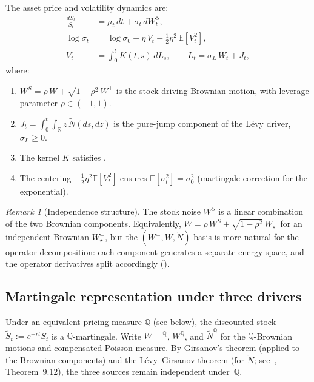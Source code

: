 \documentclass[11pt,a4paper]{article}
\theoremstyle{plain}
\theoremstyle{definition}
\theoremstyle{remark}
\newtheorem{remark}[theorem]{Remark}
\newcommand{\E}{\mathbb{E}}
\newcommand{\R}{\mathbb{R}}
\newcommand{\QQ}{\mathbb{Q}}
\newcommand{\Ntilde}{\widetilde{N}}
\begin{document}
The asset price and volatility dynamics are:
\begin{align}
  \frac{dS_t}{S_t} &= \mu_t\,dt + \sigma_t\,dW_t^S,
  \label{eq:S-dynamics}\\
  \log \sigma_t &= \log \sigma_0 + \eta\,V_t
  - \tfrac{1}{2}\eta^2\,\E[V_t^2],
  \label{eq:vol-dynamics}\\
  V_t &= \int_0^t K(t,s)\,dL_s, \qquad
  L_t = \sigma_L\,W_t + J_t,
  \label{eq:V-dynamics}
\end{align}
where:
\begin{enumerate}[label=(\roman*)]
\item $W^S = \rho\,W + \sqrt{1 - \rho^2}\,W^\perp$ is the
  stock-driving Brownian motion, with leverage parameter
  $\rho \in (-1,1)$.
\item $J_t = \int_0^t\!\!\int_\R z\,\Ntilde(ds,dz)$ is the
  pure-jump component of the L\'evy driver, $\sigma_L \geq 0$.
\item The kernel $K$ satisfies .
\item The centering $-\frac{1}{2}\eta^2\E[V_t^2]$ ensures
  $\E[\sigma_t^2] = \sigma_0^2$ (martingale correction for the
  exponential).
\end{enumerate}

\begin{remark}[Independence structure]\label{rem:independence}
The stock noise $W^S$ is a linear combination of the two Brownian
components.  Equivalently, $W = \rho\,W^S
+ \sqrt{1-\rho^2}\,W^\perp_\star$ for an independent Brownian
$W^\perp_\star$, but the $(W^\perp, W, \Ntilde)$ basis is more
natural for the operator decomposition: each component generates
a separate energy space, and the operator derivatives split
accordingly ().
\end{remark}


\subsection{Martingale representation under three drivers}

Under an equivalent pricing measure $\QQ$ (see
 below), the discounted stock
$\tilde{S}_t := e^{-rt}S_t$ is a $\QQ$-martingale.  Write
$W^{\perp,\QQ}$, $W^\QQ$, and $\Ntilde^\QQ$ for the
$\QQ$-Brownian motions and compensated Poisson measure.
By Girsanov's theorem (applied to the Brownian components)
and the L\'evy--Girsanov theorem (for $\Ntilde$;
see~\cite{ContTankov2004}, Theorem~9.12), the three
sources remain independent under~$\QQ$.
\end{document}

